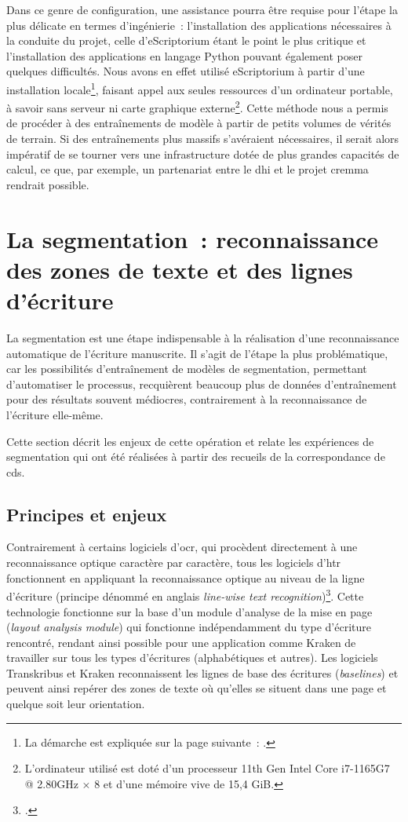 \documentclass[a4paper,12pt,twoside]{book}
\begin{document}
				Dans ce genre de configuration, une assistance pourra être requise pour l'étape la plus délicate en termes d'ingénierie~: l'installation des applications nécessaires à la conduite du projet, celle d'eScriptorium étant le point le plus critique et l'installation des applications en langage Python pouvant également poser quelques difficultés. Nous avons en effet utilisé eScriptorium à partir d'une installation locale\footnote{La démarche est expliquée sur la page suivante~: \cite{DockerInstallInstallation}.}, faisant appel aux seules ressources d'un ordinateur portable, à savoir sans serveur ni carte graphique externe\footnote{L'ordinateur utilisé est doté d'un processeur 11th Gen Intel Core i7-1165G7 @ 2.80GHz × 8 et d'une mémoire vive de 15,4 GiB.}. Cette méthode nous a permis de procéder à des entraînements de modèle à partir de petits volumes de vérités de terrain. Si des entraînements plus massifs s'avéraient nécessaires, il serait alors impératif de se tourner vers une infrastructure dotée de plus grandes capacités de calcul, ce que, par exemple, un partenariat entre le \gls{dhi} et le projet \gls{cremma} rendrait possible.
						
		\section[La segmentation]{La segmentation~: reconnaissance des zones de texte et des lignes d'écriture}
			\label{lieu-segmentation}
			
			La segmentation est une étape indispensable à la réalisation d'une reconnaissance automatique de l'écriture manuscrite. Il s'agit de l'étape la plus problématique, car les possibilités d'entraînement de modèles de segmentation, permettant d'automatiser le processus, recquièrent beaucoup plus de données d'entraînement pour des résultats souvent médiocres, contrairement à la reconnaissance de l'écriture elle-même.
			
			Cette section décrit les enjeux de cette opération et relate les expériences de segmentation qui ont été réalisées à partir des recueils de la correspondance de \gls{cds}.
						
			\subsection{Principes et enjeux}
				Contrairement à certains logiciels d'\gls{ocr}, qui procèdent directement à une reconnaissance optique caractère par caractère, tous les logiciels d'\gls{htr} fonctionnent en appliquant la reconnaissance optique au niveau de la ligne d'écriture (principe dénommé en anglais \textit{line-wise text recognition})\footcite{stokesEScriptoriumVREManuscript2021}. Cette technologie fonctionne sur la base d'un module d'analyse de la mise en page (\textit{layout analysis module}) qui fonctionne indépendamment du type d'écriture rencontré, rendant ainsi possible pour une application comme Kraken de travailler sur tous les types d'écritures (alphabétiques et autres). Les logiciels Transkribus et Kraken reconnaissent les lignes de base des écritures (\textit{baselines}) et peuvent ainsi repérer des zones de texte où qu'elles se situent dans une page et quelque soit leur orientation. 
				
\end{document}
